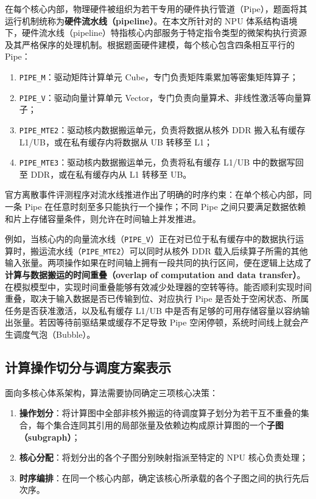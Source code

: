 \documentclass[anonymous,withtoc]{gmcm2026}
\providecommand{\tightlist}{\setlength{\itemsep}{0pt}\setlength{\parskip}{0pt}}
\begin{document}
在每个核心内部，物理硬件被组织为若干专用的硬件执行管道（Pipe），题面将其运行机制统称为\textbf{硬件流水线（pipeline）}。在本文所针对的 NPU 体系结构语境下，硬件流水线（pipeline）特指核心内部服务于特定指令类型的微架构执行资源及其严格保序的处理机制。根据题面硬件建模，每个核心包含四条相互平行的 Pipe：

\begin{enumerate}
\def\labelenumi{\arabic{enumi}.}
\tightlist
\item
  \texttt{PIPE\_M}：驱动矩阵计算单元 Cube，专门负责矩阵乘累加等密集矩阵算子；
\item
  \texttt{PIPE\_V}：驱动向量计算单元 Vector，专门负责向量算术、非线性激活等向量算子；
\item
  \texttt{PIPE\_MTE2}：驱动核内数据搬运单元，负责将数据从核外 DDR 搬入私有缓存 L1/UB，或在私有缓存内将数据从 UB 转移至 L1；
\item
  \texttt{PIPE\_MTE3}：驱动核内数据搬运单元，负责将私有缓存 L1/UB 中的数据写回至 DDR，或在私有缓存内从 L1 转移至 UB。
\end{enumerate}

官方离散事件评测程序对流水线推进作出了明确的时序约束：在单个核心内部，同一条 Pipe 在任意时刻至多只能执行一个操作；不同 Pipe 之间只要满足数据依赖和片上存储容量条件，则允许在时间轴上并发推进。

例如，当核心内的向量流水线（\texttt{PIPE\_V}）正在对已位于私有缓存中的数据执行运算时，搬运流水线（\texttt{PIPE\_MTE2}）可以同时从核外 DDR 载入后续算子所需的其他输入张量。两项操作如果在时间轴上拥有一段共同的执行区间，便在逻辑上达成了\textbf{计算与数据搬运的时间重叠（overlap of computation and data transfer）}。在模拟模型中，实现时间重叠能够有效减少处理器的空转等待。能否顺利实现时间重叠，取决于输入数据是否已传输到位、对应执行 Pipe 是否处于空闲状态、所属任务是否获准激活，以及私有缓存 L1/UB 中是否有足够的可用存储容量以容纳输出张量。若因等待前驱结果或缓存不足导致 Pipe 空闲停顿，系统时间线上就会产生调度气泡（Bubble）。

\subsection{计算操作切分与调度方案表示}

面向多核心体系架构，算法需要协同确定三项核心决策：

\begin{enumerate}
\def\labelenumi{\arabic{enumi}.}
\tightlist
\item
  \textbf{操作划分}：将计算图中全部非核外搬运的待调度算子划分为若干互不重叠的集合，每个集合连同其引用的局部张量及依赖边构成原计算图的一个\textbf{子图（subgraph）}；
\item
  \textbf{核心分配}：将划分出的各个子图分别映射指派至特定的 NPU 核心负责处理；
\item
  \textbf{时序编排}：在同一个核心内部，确定该核心所承载的各个子图之间的执行先后次序。
\end{enumerate}
\end{document}
